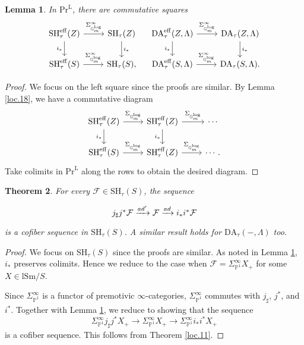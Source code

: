 \documentclass[10pt]{amsart}
\newtheorem{thm}{Theorem}[subsection]
\newtheorem{lem}[thm]{Lemma}
\theoremstyle{definition}
\theoremstyle{remark}
\numberwithin{equation}{subsection}
\renewcommand{\P}{\mathbb{P}}
\newcommand{\cF}{\mathcal{F}}
\newcommand{\eff}{{\mathrm{eff}}}
\newcommand{\PrL}{\mathrm{Pr}^{\mathrm{L}}}
\newcommand{\SH}{\mathrm{SH}}
\newcommand{\DA}{\mathrm{DA}}
\newcommand{\lSm}{\mathrm{lSm}}
\newcommand{\Gmm}{\mathbb{G}_m^{\mathrm{log}}}
\begin{document}
\begin{lem}
\label{loc.19}
In $\PrL$, there are commutative squares
\[
\begin{tikzcd}
\SH_{\tau}^\eff(Z)\ar[d,"i_*"']\ar[r,"\Sigma_{\Gmm}^\infty"]&
\SH_{\tau}(Z)\ar[d,"i_*"]
\\
\SH_{\tau}^\eff(S)\ar[r,"\Sigma_{\Gmm}^\infty"]&
\SH_{\tau}(S),
\end{tikzcd}
\quad
\begin{tikzcd}
\DA_{\tau}^\eff(Z,\Lambda)\ar[d,"i_*"']\ar[r,"\Sigma_{\Gmm}^\infty"]&
\DA_{\tau}(Z,\Lambda)\ar[d,"i_*"]
\\
\DA_{\tau}^\eff(S,\Lambda)\ar[r,"\Sigma_{\Gmm}^\infty"]&
\DA_{\tau}(S,\Lambda).
\end{tikzcd}
\]
\end{lem}
\begin{proof}
We focus on the left square since the proofs are similar.
By Lemma \ref{loc.18}, we have a commutative diagram
\[
\begin{tikzcd}
\SH_{\tau}^\eff(Z)\ar[d,"i_*"']\ar[r,"\Sigma_{\Gmm}"]&
\SH_{\tau}^\eff(Z)\ar[d,"i_*"']\ar[r,"\Sigma_{\Gmm}"]&
\cdots
\\
\SH_{\tau}^\eff(S)\ar[r,"\Sigma_{\Gmm}"]&
\SH_{\tau}^\eff(Z)\ar[r,"\Sigma_{\Gmm}"]&
\cdots.
\end{tikzcd}
\]
Take colimits in $\PrL$ along the rows to obtain the desired diagram.
\end{proof}


\begin{thm}
\label{loc.16}
For every $\cF\in \SH_{\tau}(S)$, the sequence
\begin{equation}
\label{loc.16.1}
\begin{tikzcd}
j_\sharp j^* \cF
\xrightarrow{ad'}
\cF
\xrightarrow{ad}
i_*i^*\cF
\end{tikzcd}
\end{equation}
is a cofiber sequence in $\SH_{\tau}(S)$.
A similar result holds for $\DA_{\tau}(-,\Lambda)$ too.
\end{thm}
\begin{proof}
We focus on $\SH_{\tau}(S)$ since the proofs are similar.
As noted in Lemma \ref{loc.19}, $i_*$ preserves colimits.
Hence we reduce to the case when $\cF=\Sigma_{\P^1}^\infty X_+$ for some $X\in \lSm/S$.

Since $\Sigma_{\P^1}^\infty$ is a functor of premotivic $\infty$-categories, $\Sigma_{\P^1}^\infty$ commutes with $j_\sharp$, $j^*$, and $i^*$.
Together with Lemma \ref{loc.19}, we reduce to showing that the sequence
\[
\Sigma_{\P^1}^\infty j_\sharp j^* X_+
\to
\Sigma_{\P^1}^\infty  X_+
\to
\Sigma_{\P^1}^\infty i_*i^* X_+
\]
is a cofiber sequence.
This follows from Theorem \ref{loc.11}.
\end{proof}
\end{document}
